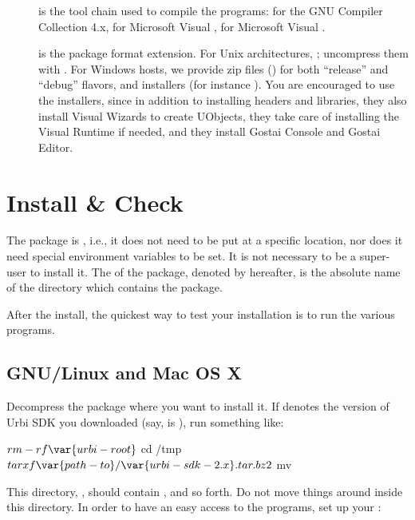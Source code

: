 \begin{description}
\item[] is the tool chain used to compile the programs:
   for the GNU Compiler Collection 4.x,  for
  Microsoft Visual ,  for Microsoft Visual
  .
\item[] is the package format extension.  For Unix architectures,
  ; uncompress them with .  For
  Windows hosts, we provide zip files () for both ``release''
  and ``debug'' flavors, and installers (for instance ).  You
  are encouraged to use the installers, since in addition to installing
  headers and libraries, they also install Visual \Cxx Wizards to create
  UObjects, they take care of installing the Visual Runtime if needed, and
  they install Gostai Console and Gostai Editor.
\end{description}

\section{Install \&{} Check}
\label{sec:install:install}

The package is , i.e., it does not need to be put at a
specific location, nor does it need special environment variables to be set.
It is not necessary to be a super-user to install it.  The  of the
package, denoted by  hereafter, is the
absolute name of the directory which contains the package.

After the install, the quickest way to test your installation is to run
the various programs.

\subsection{GNU/Linux and Mac OS X}

Decompress the package where you want to install it.  If 
denotes the version of Urbi SDK you downloaded (say,  is
), run something like:

\begin{shell}
$ rm -rf \var{urbi-root}
$ cd /tmp
$ tar xf \var{path-to}/\var{urbi-sdk-2.x}.tar.bz2
$ mv  
\end{shell}

This directory, , should contain , 
and so forth.  Do not move things around inside this directory.  In order to
have an easy access to the \urbi programs, set up your :

